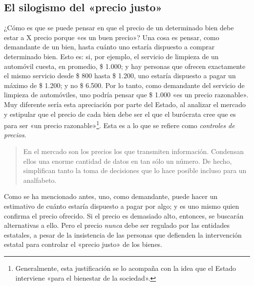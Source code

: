 \documentclass[12pt,a4paper,twoside]{book}
\begin{document}
\subsection{El silogismo del «precio justo»}
¿Cómo es que se puede pensar en que el precio de un determinado bien debe estar a X precio porque «es un buen precio»? Una cosa es pensar, como demandante de un bien, hasta cuánto uno estaría dispuesto a comprar determinado bien. Esto es: si, por ejemplo, el servicio de limpieza de un automóvil cuesta, en promedio, \$ 1.000; y hay personas que ofrecen exactamente el mismo servicio desde \$ 800 hasta \$ 1.200, uno estaría dispuesto a pagar un máximo de \$ 1.200; y no \$ 6.500. Por lo tanto, como demandante del servicio de limpieza de automóviles, uno podría pensar que \$ 1.000 «es un precio razonable». Muy diferente sería esta apreciación por parte del Estado, al analizar el mercado y estipular que el precio de cada bien debe ser el que el burócrata cree que es para ser «un precio razonable»\footnote{Generalmente, esta justificación se lo acompaña con la idea que el Estado interviene «para el bienestar de la sociedad».}. Esta es a lo que se refiere como \textit{controles de precios}.

\begin{quotation}
En el mercado son los precios los que transmiten información. Condensan ellos una enorme cantidad de datos en tan sólo un número. De hecho, simplifican tanto la toma de decisiones que lo hace posible incluso para un analfabeto. \cite[pág. 103]{elementos-econopol}
\end{quotation}

Como se ha mencionado antes, uno, como demandante, puede hacer un estimativo de cuánto estaría dispuesto a pagar por algo; y es uno mismo quien confirma el precio ofrecido. Si el precio es demasiado alto, entonces, se buscarán alternativas a ello. Pero el precio \textit{nunca} debe ser regulado por las entidades estatales, a pesar de la insistencia de las personas que defienden la intervención estatal para controlar el «precio justo» de los bienes.
\end{document}
